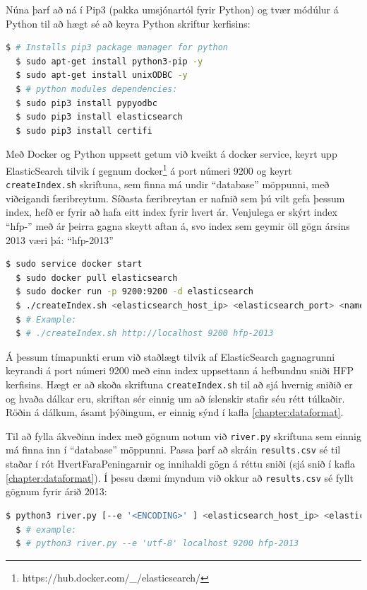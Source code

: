 \documentclass{article}
\theoremstyle{blueP}
\theoremstyle{greenS}
\begin{document}
\noindent Núna þarf að ná í Pip3 (pakka umsjónartól fyrir Python) og tvær módúlur á Python til að hægt sé að keyra Python skriftur kerfisins:
\begin{lstlisting}[language=bash]
  $ # Installs pip3 package manager for python
  $ sudo apt-get install python3-pip -y
  $ sudo apt-get install unixODBC -y
  $ # python modules dependencies:
  $ sudo pip3 install pypyodbc
  $ sudo pip3 install elasticsearch
  $ sudo pip3 install certifi
\end{lstlisting}

\noindent Með Docker og Python uppsett getum við kveikt á docker service, keyrt upp ElasticSearch tilvik í gegnum docker\footnote{https://hub.docker.com/\_/elasticsearch/} á port númeri 9200 og keyrt \lstinline{createIndex.sh} skriftuna, sem finna má undir ``database'' möppunni, með viðeigandi færibreytum. Síðasta færibreytan er nafnið sem þú vilt gefa þessum index, hefð er fyrir að hafa eitt index fyrir hvert ár. Venjulega er skýrt index ``hfp-'' með ár þeirra gagna skeytt aftan á, svo index sem geymir öll gögn ársins 2013 væri þá: ``hfp-2013''
\begin{lstlisting}[language=bash]
  $ sudo service docker start
  $ sudo docker pull elasticsearch
  $ sudo docker run -p 9200:9200 -d elasticsearch
  $ ./createIndex.sh <elasticsearch_host_ip> <elasticsearch_port> <name_of_index>
  $ # Example:
  $ # ./createIndex.sh http://localhost 9200 hfp-2013
\end{lstlisting}

\noindent Á þessum tímapunkti erum við staðlægt tilvik af ElasticSearch gagnagrunni keyrandi á port númeri 9200 með einn index uppsettann á hefbundnu sniði HFP kerfisins. Hægt er að skoða skriftuna \lstinline{createIndex.sh} til að sjá hvernig sniðið er og hvaða dálkar eru, skriftan sér einnig um að íslenskir stafir séu rétt túlkaðir. Röðin á dálkum, ásamt þýðingum, er einnig sýnd í kafla \ref{chapter:dataformat}.

\noindent Til að fylla ákveðinn index með gögnum notum við \lstinline{river.py} skriftuna sem einnig má finna inn í ``database'' möppunni. Passa þarf að skráin \lstinline{results.csv} sé til staðar í rót HvertFaraPeningarnir og innihaldi gögn á réttu sniði (sjá snið í kafla \ref{chapter:dataformat}). Í þessu dæmi ímyndum við okkur að \lstinline{results.csv} sé fyllt gögnum fyrir árið 2013:
\begin{lstlisting}[language=bash]
  $ python3 river.py [--e '<ENCODING>' ] <elasticsearch_host_ip> <elasticsearch_port> <index_to_fill>
  $ # example: 
  $ # python3 river.py --e 'utf-8' localhost 9200 hfp-2013
\end{lstlisting}
\end{document}
